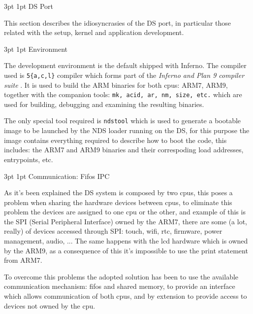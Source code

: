 \documentclass[11pt]{p9article}
\makeatletter
\renewcommand\section{\@startsection {section}{1}{\z@} {3pt} {1pt}
{\normalfont\normalsize\bfseries}}
\renewcommand\subsection{\@startsection {subsection}{1}{\z@} {3pt}
{1pt} {\normalfont\normalsize\bfseries}}
\makeatother
\begin{document}
\section{DS Port}

This section describes the idiosyncrasies of the DS port,
in particular those related with the setup, kernel and application development.

\subsection{Environment}

The development environment is the default shipped with Inferno.
The compiler used is \texttt{5\{a,c,l\}} compiler which forms part of the
\emph{Inferno and Plan 9 compiler suite} \cite{ken-cc}.
It is used to build the ARM \cite{armarm} binaries for both cpus: ARM7, ARM9,
together with the companion tools: \texttt{mk, acid, ar, nm, size, etc.} which are used for building, debugging and examining the resulting binaries.

The only special tool required is \texttt{ndstool} \cite{ndstool} which is used to generate a bootable image
to be launched by the NDS loader running on the DS, for this purpose the image contains
everything required to describe how to boot the code, this includes: 
the ARM7 and ARM9 binaries and their correspoding load addresses, entrypoints, etc.
	
\subsection{Communication: Fifos IPC}

As it's been explained the DS system is composed by two cpus,
this poses a problem when sharing the hardware devices between cpus,
to eliminate this problem the devices are assigned to one cpu or the other,
and example of this is the SPI (Serial Peripheral Interface) owned by the ARM7,
there are some (a lot, really) of devices accessed through SPI:
	touch, wifi, rtc, firmware, power management, audio, ...
The same happens with the lcd hardware which is owned by the ARM9,
as a consequence of this it's impossible to use the print statement from ARM7.

To overcome this problems  the adopted solution has been to use
the available communication mechanism: fifos and shared memory,
to provide an interface which allows communication of both cpus,
and by extension to provide access to devices not owned by the cpu.
\end{document}
